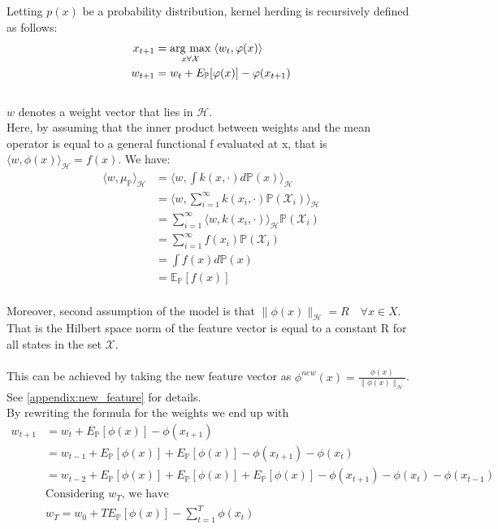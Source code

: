 Letting $p(x)$ be a probability distribution, kernel herding is recursively defined as follows:
\begin{align*}
x_{t+1} &=\underset{x\forall \mathcal{X}}{\operatorname{arg}\,\operatorname{max}}\;\langle w_{t},\varphi(x)\rangle 
\\
w_{t+1} &= w_{t} + E_{\mathbb{P}}[\varphi(x)]-\varphi(x_{t+1})    
\end{align*}
\\
$w$ denotes a weight vector that lies in $\mathcal{H}$.
\\
Here, by assuming that the inner product between weights and the mean operator is equal to a general functional f evaluated at x, that is $\langle w, \phi(x) \rangle_{\mathcal{H}}=f(x)$.
We have:
\begin{align*}
\langle w, \mu_{\mathbb{P}} \rangle_{\mathcal{H}}
&= \langle w, \int k(x,\cdot)d\mathbb{P}(x) \rangle_{\mathcal{H}}
\\
&= \langle w, \sum\limits_{i=1}^{\infty} k(x_{i},\cdot)\mathbb{P}(\mathcal{X}_{i})\rangle_{\mathcal{H}}
\\
&= \sum \limits_{i=1}^{\infty} \langle w, k(x_{i}, \cdot) \rangle_{\mathcal{H}}\mathbb{P}(\mathcal{X}_{i})
\\
&= \sum \limits_{i=1}^{\infty}f(x_{i})\mathbb{P}(\mathcal{X}_{i})
\\
&=\int f(x) d\mathbb{P}(x)
\\
&= \mathbb{E}_{\mathbb{P}} [f(x)]
\end{align*}
\\
Moreover, second assumption of the model is that $\|\phi(x)\|_{\mathcal{H}}=R \quad \forall x \in X$.
That is the Hilbert space norm of the feature vector is equal to a constant R for all states in the set $\mathcal{X}$.
\\
\\
This can be achieved by taking the new feature vector as $\phi^{new} (x)=\frac{\phi(x)}{\|\phi(x)\|_{\mathcal{H}}}$.
See \ref{appendix:new_feature} for details.
\\
By rewriting the formula for the weights we end up with
\begin{align*}
w_{t+1} &= w_{t} + E_{\mathbb{P}}[\phi(x)]-\phi(x_{t+1})
\\
&= w_{t-1} + E_{\mathbb{P}}[\phi(x)]+E_{\mathbb{P}}[\phi(x)]-\phi(x_{t+1})-\phi(x_{t})
\\
&= w_{t-2} + E_{\mathbb{P}}[\phi(x)]+E_{\mathbb{P}}[\phi(x)]+E_{\mathbb{P}}[\phi(x)]-\phi(x_{t+1})-\phi(x_{t})-\phi(x_{t-1})
\\
&\text{Considering $w_{T}$, we have}
\\
&
w_{T}=w_{0}+TE_{\mathbb{P}}[\phi(x)]-\sum\limits_{t=1}^{T}\phi(x_{t})
\end{align*}
